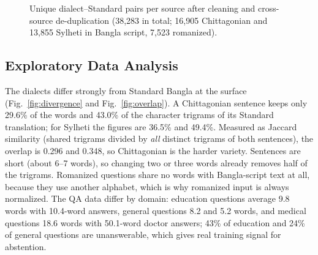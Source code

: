 \begin{figure}[!t]
\centering
{}
\caption{Unique dialect--Standard pairs per source after cleaning and cross-source de-duplication (38,283 in total; 16,905 Chittagonian and 13,855 Sylheti in Bangla script, 7,523 romanized).}
\label{fig:sources}
\end{figure}

\subsection{Exploratory Data Analysis}
The dialects differ strongly from Standard Bangla at the surface (Fig.~\ref{fig:divergence} and Fig.~\ref{fig:overlap}). A Chittagonian sentence keeps only 29.6\% of the words and 43.0\% of the character trigrams of its Standard translation; for Sylheti the figures are 36.5\% and 49.4\%. Measured as Jaccard similarity (shared trigrams divided by \emph{all} distinct trigrams of both sentences), the overlap is 0.296 and 0.348, so Chittagonian is the harder variety. Sentences are short (about 6--7 words), so changing two or three words already removes half of the trigrams. Romanized questions share no words with Bangla-script text at all, because they use another alphabet, which is why romanized input is always normalized. The QA data differ by domain: education questions average 9.8 words with 10.4-word answers, general questions 8.2 and 5.2 words, and medical questions 18.6 words with 50.1-word doctor answers; 43\% of education and 24\% of general questions are unanswerable, which gives real training signal for abstention.

